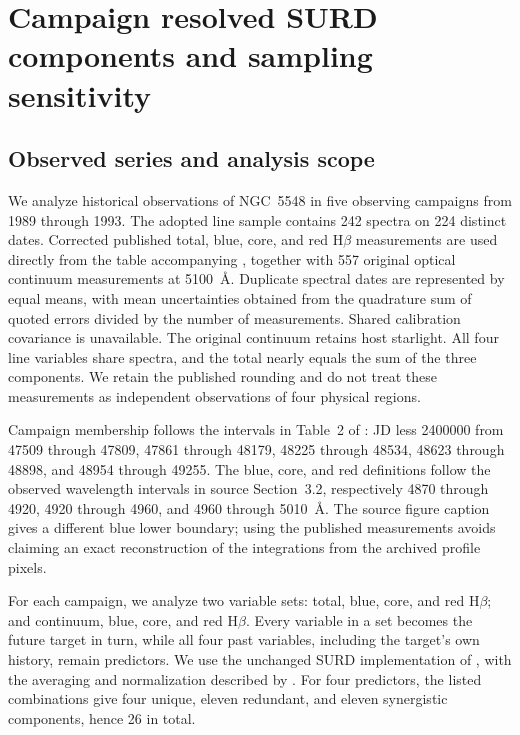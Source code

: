 \providecommand{\SURDResultsPath}{collaborator_rebuild/results_section}

\section{Campaign resolved SURD components and sampling sensitivity}
\label{sec:campaign_surd_results}

\subsection{Observed series and analysis scope}

We analyze historical observations of NGC~5548 in five observing campaigns
from 1989 through 1993. The adopted line sample contains 242 spectra on
224 distinct dates. Corrected published total, blue, core, and red
H$\beta$ measurements are used directly from the table accompanying
\citet{WandersPeterson1996}, together with 557 original optical continuum
measurements at 5100~\AA. Duplicate spectral dates are represented by equal
means, with mean uncertainties obtained from the quadrature sum of quoted
errors divided by the number of measurements. Shared calibration covariance
is unavailable. The original continuum retains host starlight.
All four line variables share spectra, and the total nearly equals the sum
of the three components. We retain the published rounding and do not treat
these measurements as independent observations of four physical regions.

Campaign membership follows the intervals in Table~2 of
\citet{Peterson2004ApJ}: JD less 2400000 from 47509 through 47809,
47861 through 48179, 48225 through 48534, 48623 through 48898,
and 48954 through 49255. The blue, core, and red definitions follow
the observed wavelength intervals in source Section~3.2, respectively
4870 through 4920, 4920 through 4960, and 4960 through 5010~\AA.
The source figure caption gives a different blue lower boundary;
using the published measurements avoids claiming an exact reconstruction
of the integrations from the archived profile pixels.

For each campaign, we analyze two variable sets: total, blue, core, and
red H$\beta$; and continuum, blue, core, and red H$\beta$.
Every variable in a set becomes the future target in turn, while all four
past variables, including the target's own history, remain predictors.
We use the unchanged SURD implementation of \citet{MartinezSanchez2024SURD}, with
the averaging and normalization described by \citet{MartinezSanchez2025Thesis}.
For four predictors, the listed combinations give four unique,
eleven redundant, and eleven synergistic components, hence 26 in total.

